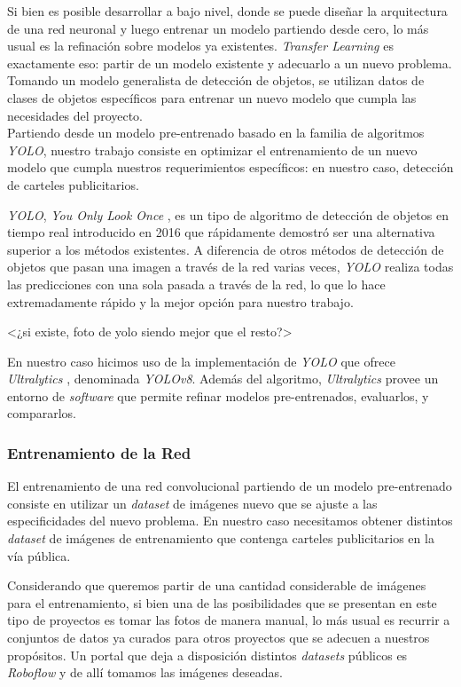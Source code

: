 \documentclass[a4paper]{article}
\begin{document}
Si bien es posible desarrollar a bajo nivel, donde se puede diseñar la arquitectura de una red neuronal y luego entrenar un modelo partiendo desde cero, lo más usual es la refinación sobre modelos ya existentes. \textit{Transfer Learning} es exactamente eso: partir de un modelo existente y adecuarlo a un nuevo problema. Tomando un modelo generalista de detección de objetos, se utilizan datos de clases de objetos específicos para entrenar un nuevo modelo que cumpla las necesidades del proyecto.\\

Partiendo desde un modelo pre-entrenado basado en la familia de algoritmos \textit{YOLO}, nuestro trabajo consiste en optimizar el entrenamiento de un nuevo modelo que cumpla nuestros requerimientos específicos: en nuestro caso, detección de carteles publicitarios.

\textit{YOLO}, \textit{You Only Look Once} \cite{yolov1}, es un tipo de algoritmo de detección de objetos en tiempo real introducido en 2016 que rápidamente demostró ser una alternativa superior a los métodos existentes. A diferencia de otros métodos de detección de objetos que pasan una imagen a través de la red varias veces, \textit{YOLO} realiza todas las predicciones con una sola pasada a través de la red, lo que lo hace extremadamente rápido y la mejor opción para nuestro trabajo.

<¿si existe, foto de yolo siendo mejor que el resto?>

En nuestro caso hicimos uso de la implementación de \textit{YOLO} que ofrece \textit{Ultralytics} \cite{ultralytics}, denominada \textit{YOLOv8}. Además del algoritmo, \textit{Ultralytics} provee un entorno de \textit{software} que permite refinar modelos pre-entrenados, evaluarlos, y compararlos.

\subsubsection{Entrenamiento de la Red}

El entrenamiento de una red convolucional partiendo de un modelo pre-entrenado consiste en utilizar un \textit{dataset} de imágenes nuevo que se ajuste a las especificidades del nuevo problema. En nuestro caso necesitamos obtener distintos \textit{dataset} de imágenes de entrenamiento que contenga carteles publicitarios en la vía pública.

Considerando que queremos partir de una cantidad considerable de imágenes para el entrenamiento, si bien una de las posibilidades que se presentan en este tipo de proyectos es tomar las fotos de manera manual, lo más usual es recurrir a conjuntos de datos ya curados para otros proyectos que se adecuen a nuestros propósitos. Un portal que deja a disposición distintos \textit{datasets} públicos es \textit{Roboflow} \cite{roboflow} y de allí tomamos las imágenes deseadas.\\
\end{document}
